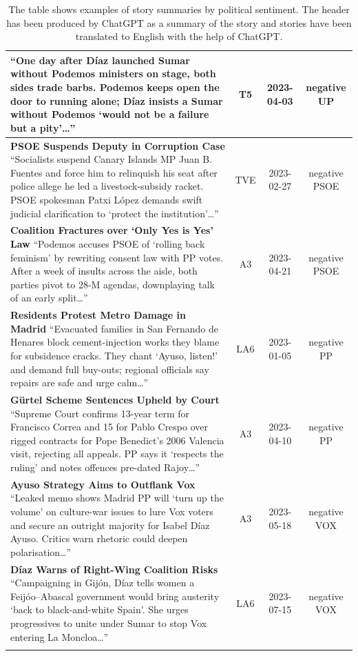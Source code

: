\documentclass[12pt]{article}
\begin{document}
\begin{longtable}{|p{8cm}|c|c|c|}
	{\scriptsize
		“One day after Díaz launched Sumar without Podemos ministers on stage, both sides trade barbs.  
		Podemos keeps open the door to running alone; Díaz insists a Sumar without Podemos ‘would not be a failure but a pity’…”}
	& T5 & 2023-04-03 & negative UP\\
	\hline
	\textbf{PSOE Suspends Deputy in Corruption Case}\newline
	{\scriptsize
		“Socialists suspend Canary Islands MP Juan B. Fuentes and force him to relinquish his seat after police allege he led a livestock-subsidy racket.  
		PSOE spokesman Patxi López demands swift judicial clarification to ‘protect the institution’…”}
	& TVE & 2023-02-27 & negative PSOE\\
	\hline
	\textbf{Coalition Fractures over ‘Only Yes is Yes’ Law}\newline
	{\scriptsize
		“Podemos accuses PSOE of ‘rolling back feminism’ by rewriting consent law with PP votes.  
		After a week of insults across the aisle, both parties pivot to 28-M agendas, downplaying talk of an early split…”}
	& A3 & 2023-04-21 & negative PSOE\\
	\hline
	\textbf{Residents Protest Metro Damage in Madrid}\newline
	{\scriptsize
		“Evacuated families in San Fernando de Henares block cement-injection works they blame for subsidence cracks.  
		They chant ‘Ayuso, listen!’ and demand full buy-outs; regional officials say repairs are safe and urge calm…”}
	& LA6 & 2023-01-05 & negative PP\\
	\hline
	\textbf{Gürtel Scheme Sentences Upheld by Court}\newline
	{\scriptsize
		“Supreme Court confirms 13-year term for Francisco Correa and 15 for Pablo Crespo over rigged contracts for Pope Benedict’s 2006 Valencia visit, rejecting all appeals.  
		PP says it ‘respects the ruling’ and notes offences pre-dated Rajoy…”}
	& A3 & 2023-04-10 & negative PP\\
	\hline
	\textbf{Ayuso Strategy Aims to Outflank Vox}\newline
	{\scriptsize
		“Leaked memo shows Madrid PP will ‘turn up the volume’ on culture-war issues to lure Vox voters and secure an outright majority for Isabel Díaz Ayuso.  
		Critics warn rhetoric could deepen polarisation…”}
	& A3 & 2023-05-18 & negative VOX\\
	\hline
	\textbf{Díaz Warns of Right-Wing Coalition Risks}\newline
	{\scriptsize
		“Campaigning in Gijón, Díaz tells women a Feijóo–Abascal government would bring austerity ‘back to black-and-white Spain’.  
		She urges progressives to unite under Sumar to stop Vox entering La Moncloa…”}
	& LA6 & 2023-07-15 & negative VOX\\
	\hline
	\caption*{The table shows examples of story summaries by political sentiment. The header has been produced by ChatGPT as a summary of the story and stories have been translated to English with the help of ChatGPT. }
\end{longtable}
\end{document}

